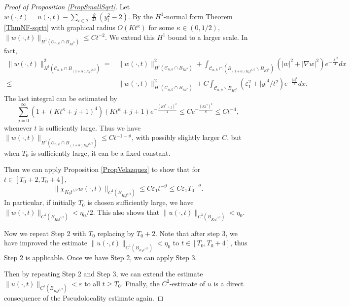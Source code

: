 \documentclass[11pt]{amsart}
\numberwithin{equation}{section}
\numberwithin{equation}{section}
\newcommand{\eps}{\varepsilon}
\newcommand{\cC}{\mathcal{C}}
\begin{document}
\begin{proof}[Proof of Proposition \ref{PropSmallSqrt}]
		
		Let $w(\cdot,t)=u(\cdot,t)-\sum_{i\in \mathcal I}\frac{\varrho }{4t}(y_i^2-2)$. By the $H^1$-normal form Theorem \ref{ThmNF-sqrtt} with graphical radius $O(K t^{\kappa})$ for some $\kappa\in(0,1/2)$, $\|w(\cdot,t)\|_{H^1(\cC_{n,k}\cap B_{K t^\kappa})}\leq Ct^{-2}$. We extend this $H^1$ bound to a larger scale. In fact,
		\begin{align*}
			\|w(\cdot,t)\|^2_{H^1(\cC_{n,k}\cap B_{(1+\alpha)K_0t^{1/2}})}
			= &
			\|w(\cdot,t)\|^2_{H^1(\cC_{n,k}\cap B_{K t^\kappa})}
			+
			\int_{\cC_{n,k}\cap (B_{(1+\alpha)K_0t^{1/2}}\backslash B_{K t^\kappa})}(|w|^2+|\nabla w|^2)e^{-\frac{|x|^2}{4}}dx
			\\
			\leq & 
			\|w(\cdot,t)\|^2_{H^1(\cC_{n,k}\cap B_{K t^\kappa})}
			+
			C\int_{\cC_{n,k}\backslash B_{K t^\kappa}} (\eps_1^2+|y|^4/t^2)e^{-\frac{|x|^2}{4}}dx
			.
		\end{align*}
		The last integral can be estimated by
		\[
		\sum_{j=0}^\infty (1+(K t^\kappa+j+1)^4)(K t^\kappa+j+1)e^{-\frac{(K t^\kappa+j)^2}{4}}
		\leq 
		Ce^{-\frac{(Kt^{\kappa})^2}{8}}
		\leq Ct^{-4},
		\]
		whenever $t$ is sufficiently large. Thus we have $\|w(\cdot,t)\|_{H^1(\cC_{n,k}\cap B_{(1+\alpha)K_0t^{1/2}})}\leq Ct^{-1-\vartheta}$, with possibly slightly larger $C$, but when $T_0$ is sufficiently large, it can be a fixed constant.
		
		Then we can apply Proposition \ref{PropVelazquez} to show that for $t\in[T_0+2, T_0+4]$,
		\begin{equation}
			\|\chi_{K_0t^{1/2}}w(\cdot,t)\|_{C^1(B_{K_0 t^{1/2}})}\leq C\eps_1 t^{-\vartheta}\leq C\eps_1 {T_0}^{-\vartheta}.
		\end{equation}
		In particular, if initially $T_0$ is chosen sufficiently large, we have $\|w(\cdot,t)\|_{C^1(B_{K_0 t^{1/2}})}< \eta_0/2.$ This also shows that $\|u(\cdot,t)\|_{C^1(B_{K_0 t^{1/2}})}< \eta_0$.
		
		
		 Now we repeat Step 2 with $T_0$ replacing by $T_0+2$. Note that after step 3, we have improved the estimate $\|u(\cdot,t)\|_{C^1(B_{K_0t^{1/2}})}<\eta_0$ to $t\in[T_0,T_0+4]$, thus Step 2 is applicable. Once we have Step 2, we can apply Step 3.
		
		Then by repeating Step 2 and Step 3, we can extend the estimate $\|u(\cdot,t)\|_{C^1(B_{K_0 t^{1/2}})}<\eps$ to all $t\geq T_0$. Finally, the $C^2$-estimate of $u$ is a direct consequence of the Pseudolocality estimate again.
	\end{proof}
	
\end{document}
